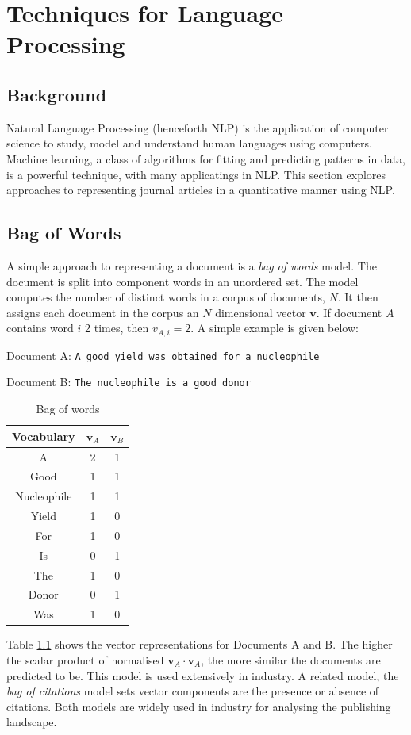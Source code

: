 \chapter{Techniques for Language Processing}
\label{chapt:NLP}
\section{Background}
Natural Language Processing (henceforth NLP) is the application of computer science to study, model and understand human languages using computers. Machine learning, a class of algorithms for fitting and predicting patterns in data, is a powerful technique, with many applicatings in NLP. This section explores approaches to representing journal articles in a quantitative manner using NLP.
\section{Bag of Words}
A simple approach to representing a document is a \emph{bag of words} model. The document is split into component words in an unordered set. The model computes the number of distinct words in a corpus of documents, $N$. It then assigns each document in the corpus an $N$ dimensional vector $\mathbf{v}$. If document $A$ contains word $i$ 2 times, then $v_{A, i } = 2$. A simple example is given below:

Document A: \texttt{A good yield was obtained for a nucleophile}

Document B: \texttt{The nucleophile is a good donor}
\begin{table}[H]
\label{tab:BAGOFWORDS}
\caption{Bag of words}
\begin{center}
\begin{tabular}{||c|c|c||}
\hline
Vocabulary &  $\mathbf{v}_A$ & $\mathbf{v}_B$\\
\hline
A & 2 & 1\\
Good & 1 & 1\\
Nucleophile & 1 & 1 \\
Yield & 1 & 0\\
For & 1& 0\\
Is & 0 & 1\\
The & 1 & 0\\
Donor & 0 & 1\\
Was & 1 & 0\\
\hline
\end{tabular}
\end{center}
\end{table}
Table \ref{tab:BAGOFWORDS} shows the vector representations for Documents A and B. The higher the scalar product of normalised $\mathbf{v}_A \cdot \mathbf{v}_A$, the more similar the documents are predicted to be. This model is used extensively in industry. A related model, the \emph{bag of citations} model sets vector components are the presence or absence of citations. Both models are widely used in industry for analysing the publishing landscape.
